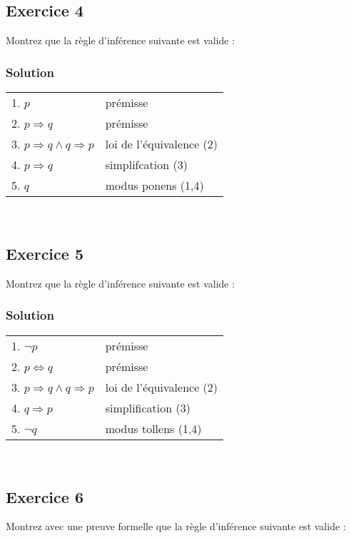 \subsection*{Exercice 4}
Montrez que la règle d'inférence suivante est valide :

\subsubsection*{Solution}

\begin{tabular}{|l|l|}
\hline
1. $p$ & prémisse \\
2. $ p \Rightarrow q $ & prémisse \\
3. $ p \Rightarrow q \land q \Rightarrow p$ & loi de l'équivalence (2)\\
4. $ p \Rightarrow q$ & simplifcation (3)\\ 
5. $ q$ & modus ponens (1,4)\\
\hline
\end{tabular}\\

\subsection*{Exercice 5}
Montrez que la règle d'inférence suivante est valide :


\subsubsection*{Solution}

\begin{tabular}{|l|l|}
\hline
1. $ \neg p $ & prémisse \\
2. $ p \Leftrightarrow q $ & prémisse \\
3. $ p \Rightarrow q \land q \Rightarrow p $ & loi de l'équivalence (2)  \\
4. $ q \Rightarrow p $ & simplification (3) \\
5. $ \neg q $ & modus tollens (1,4)\\
\hline
\end{tabular}\\

\newpage
\subsection*{Exercice 6}
Montrez avec une preuve formelle que la règle d'inférence suivante est valide :
